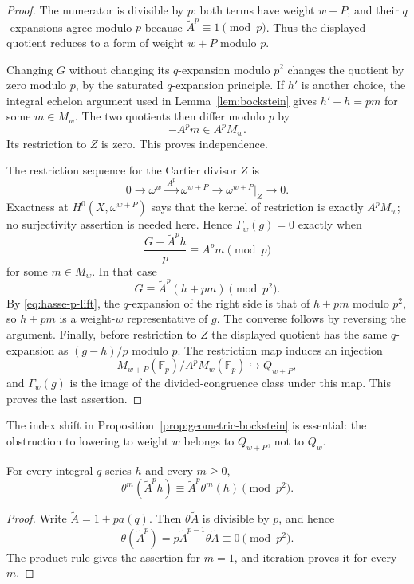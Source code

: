 \begin{proof}
The numerator is divisible by $p$: both terms have weight $w+P$, and their
$q$-expansions agree modulo $p$ because $\widetilde A^p\equiv1\pmod p$.
Thus the displayed quotient reduces to a form of weight $w+P$ modulo $p$.

Changing $G$ without changing its $q$-expansion modulo $p^2$ changes the
quotient by zero modulo $p$, by the saturated $q$-expansion principle.
If $h'$ is another choice, the integral echelon argument used in
Lemma~\ref{lem:bockstein} gives $h'-h=pm$ for some $m\in M_w$.  The two
quotients then differ modulo $p$ by
\[
 -A^p m\in A^pM_w.
\]
Its restriction to $Z$ is zero.  This proves independence.

The restriction sequence for the Cartier divisor $Z$ is
\[
 0\longrightarrow\omega^w
 \xrightarrow{\ A^p\ }\omega^{w+P}
 \longrightarrow\omega^{w+P}\vert_Z\longrightarrow0.
\]
Exactness at $H^0(X,\omega^{w+P})$ says that the kernel of restriction is
exactly $A^pM_w$; no surjectivity assertion is needed here.  Hence
$\Gamma_w(g)=0$ exactly when
\[
 \frac{G-\widetilde A^p h}{p}\equiv A^pm\pmod p
\]
for some $m\in M_w$.  In that case
\[
 G\equiv\widetilde A^p(h+pm)\pmod {p^2}.
\]
By \eqref{eq:hasse-p-lift}, the $q$-expansion of the right side is that of
$h+pm$ modulo $p^2$, so $h+pm$ is a weight-$w$ representative of $g$.
The converse follows by reversing the argument.  Finally, before
restriction to $Z$ the displayed quotient has the same $q$-expansion as
$(g-h)/p$ modulo $p$.  The restriction map induces an injection
\[
 M_{w+P}(\mathbb F_p)/A^pM_w(\mathbb F_p)
 \hookrightarrow Q_{w+P},
\]
and $\Gamma_w(g)$ is the image of the divided-congruence class under this
map.  This proves the last assertion.
\end{proof}

The index shift in Proposition~\ref{prop:geometric-bockstein} is essential:
the obstruction to lowering to weight $w$ belongs to $Q_{w+P}$, not to
$Q_w$.

\begin{lemma}
\label{lem:theta-hasse-inclusion}
For every integral $q$-series $h$ and every $m\geq 0$,
\[
 \theta^m(\widetilde A^p h)
 \equiv \widetilde A^p\theta^m(h)\pmod {p^2}.
\]
\end{lemma}

\begin{proof}
Write $\widetilde A=1+pa(q)$.  Then $\theta\widetilde A$ is divisible by
$p$, and hence
\[
 \theta(\widetilde A^p)
 =p\widetilde A^{p-1}\theta\widetilde A
 \equiv0\pmod {p^2}.
\]
The product rule gives the assertion for $m=1$, and iteration proves it
for every $m$.
\end{proof}

